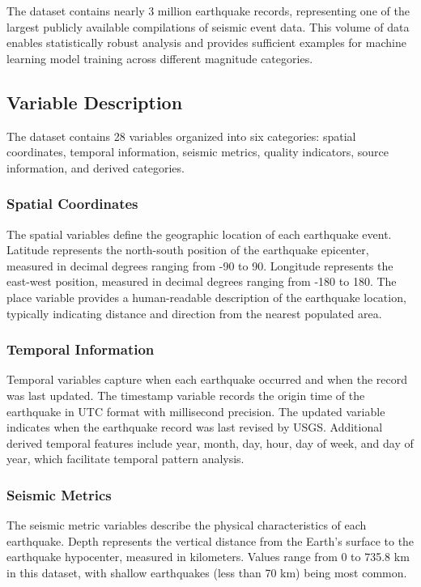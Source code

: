The dataset contains nearly 3 million earthquake records, representing one of the largest publicly available compilations of seismic event data. This volume of data enables statistically robust analysis and provides sufficient examples for machine learning model training across different magnitude categories.

\subsection{Variable Description}

The dataset contains 28 variables organized into six categories: spatial coordinates, temporal information, seismic metrics, quality indicators, source information, and derived categories.

\subsubsection{Spatial Coordinates}

The spatial variables define the geographic location of each earthquake event. Latitude represents the north-south position of the earthquake epicenter, measured in decimal degrees ranging from -90 to 90. Longitude represents the east-west position, measured in decimal degrees ranging from -180 to 180. The place variable provides a human-readable description of the earthquake location, typically indicating distance and direction from the nearest populated area.

\subsubsection{Temporal Information}

Temporal variables capture when each earthquake occurred and when the record was last updated. The timestamp variable records the origin time of the earthquake in UTC format with millisecond precision. The updated variable indicates when the earthquake record was last revised by USGS. Additional derived temporal features include year, month, day, hour, day of week, and day of year, which facilitate temporal pattern analysis.

\subsubsection{Seismic Metrics}

The seismic metric variables describe the physical characteristics of each earthquake. Depth represents the vertical distance from the Earth's surface to the earthquake hypocenter, measured in kilometers. Values range from 0 to 735.8 km in this dataset, with shallow earthquakes (less than 70 km) being most common.

